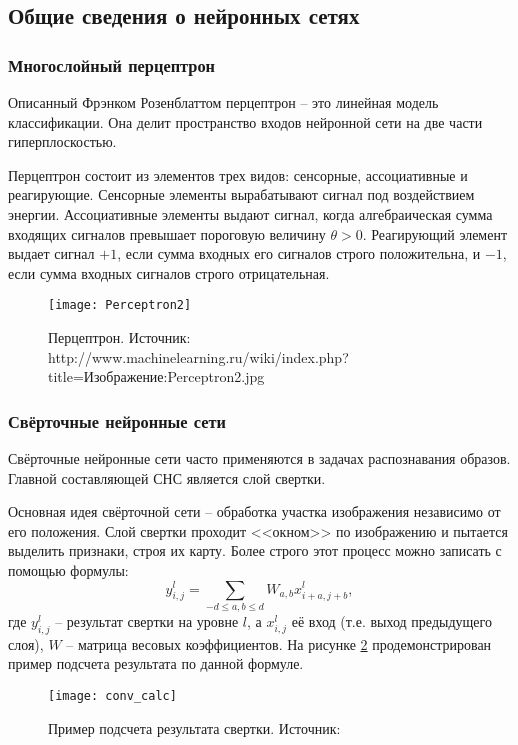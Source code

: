 \subsection{Общие сведения о нейронных сетях}
\subsubsection{Многослойный перцептрон}
Описанный Фрэнком Розенблаттом перцептрон -- это линейная модель классификации.
Она делит пространство входов нейронной сети на две части гиперплоскостью\cite{Rosenblatt1958}.

Перцептрон состоит из элементов трех видов: сенсорные, ассоциативные и
реагирующие. Сенсорные элементы вырабатывают сигнал под воздействием энергии.
Ассоциативные элементы выдают сигнал, когда алгебраическая сумма входящих
сигналов превышает пороговую величину $\theta > 0$. Реагирующий элемент выдает
сигнал $+1$, если сумма входных его сигналов строго положительна, и $-1$, если
сумма входных сигналов строго отрицательная.
\begin{figure}[h]
\centering
\texttt{[image: Perceptron2]}
\caption{Перцептрон. Источник: http://www.machinelearning.ru/wiki/index.php?title=Изображение:Perceptron2.jpg}
\label{fig:perceptron}
\end{figure}
\subsubsection{Свёрточные нейронные сети}
Свёрточные нейронные сети часто применяются в задачах распознавания образов.
Главной составляющей СНС является слой свертки.

Основная идея свёрточной сети -- обработка участка изображения независимо от
его положения. Слой свертки проходит <<окном>> по изображению и пытается
выделить признаки, строя их карту. Более строго этот процесс можно записать
с помощью формулы:
\[
y^{l}_{i, j} = \sum_{-d \leq a, b \leq d} W_{a,b}x^l_{i + a, j + b},
\]
где $y^l_{i, j}$ -- результат свертки на уровне $l$, а $x^l_{i, j}$ её вход (т.е.
выход предыдущего слоя), $W$ -- матрица весовых коэффициентов\cite{deeplearning}. 
На рисунке \ref{fig:conv_calc} продемонстрирован пример подсчета результата по 
данной формуле.
\begin{figure}[h]
\centering
\texttt{[image: conv\_calc]}
\caption{Пример подсчета результата свертки. Источник: \cite{deeplearning}}
\label{fig:conv_calc}
\end{figure}


